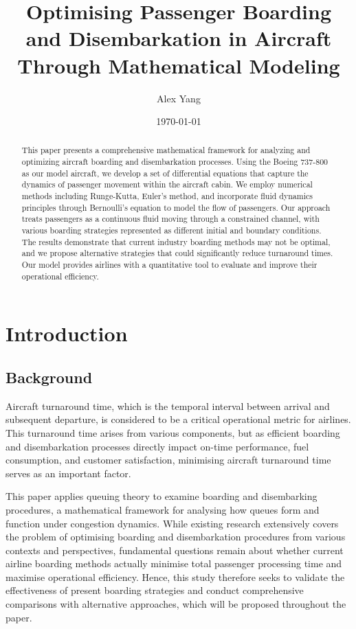 \documentclass[a4paper,12pt]{article}
\title{Optimising Passenger Boarding and Disembarkation in Aircraft Through Mathematical Modeling}
\author{Alex Yang}
\date{\today}
\begin{document}
\maketitle

\begin{abstract}
This paper presents a comprehensive mathematical framework for analyzing and optimizing aircraft boarding and disembarkation processes. Using the Boeing 737-800 as our model aircraft, we develop a set of differential equations that capture the dynamics of passenger movement within the aircraft cabin. We employ numerical methods including Runge-Kutta, Euler's method, and incorporate fluid dynamics principles through Bernoulli's equation to model the flow of passengers. Our approach treats passengers as a continuous fluid moving through a constrained channel, with various boarding strategies represented as different initial and boundary conditions. The results demonstrate that current industry boarding methods may not be optimal, and we propose alternative strategies that could significantly reduce turnaround times. Our model provides airlines with a quantitative tool to evaluate and improve their operational efficiency.
\end{abstract}

\section{Introduction}
\subsection{Background}

Aircraft turnaround time, which is the temporal interval between arrival and subsequent departure, is considered to be a critical operational metric for airlines. This turnaround time arises from various components, but as efficient boarding and disembarkation processes directly impact on-time performance, fuel consumption, and customer satisfaction, minimising aircraft turnaround time serves as an important factor. 

This paper applies queuing theory to examine boarding and disembarking procedures, a mathematical framework for analysing how queues form and function under congestion dynamics. While existing research extensively covers the problem of optimising boarding and disembarkation procedures from various contexts and perspectives, fundamental questions remain about whether current airline boarding methods actually minimise total passenger processing time and maximise operational efficiency. Hence, this study therefore seeks to validate the effectiveness of present boarding strategies and conduct comprehensive comparisons with alternative approaches, which will be proposed throughout the paper.
\end{document}
